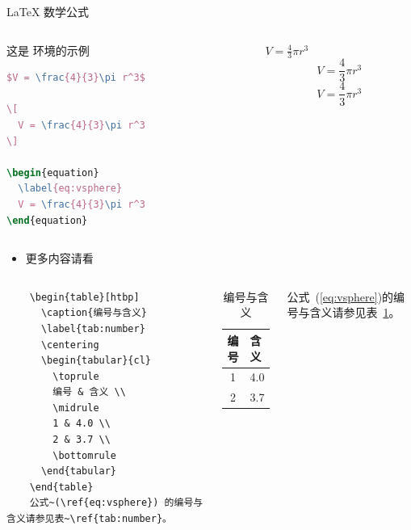 \documentclass{beamer}
\begin{document}
\begin{frame}[fragile]{\LaTeX{} 数学公式}
    \begin{columns}
        \begin{column}{.55\textwidth}
            这是  环境的示例
\begin{lstlisting}[language=TeX]
$V = \frac{4}{3}\pi r^3$

\[
  V = \frac{4}{3}\pi r^3
\]

\begin{equation}
  \label{eq:vsphere}
  V = \frac{4}{3}\pi r^3
\end{equation}
\end{lstlisting}
        \end{column}
        \begin{column}{.4\textwidth}
            $V = \frac{4}{3}\pi r^3$
            \[
                V = \frac{4}{3}\pi r^3
            \]
            \begin{equation}
                \label{eq:vsphere}
                V = \frac{4}{3}\pi r^3
            \end{equation}
        \end{column}
    \end{columns}
    \begin{itemize}
        \item 更多内容请看 \href{https://zh.wikipedia.org/wiki/Help:数学公式}{\color{purple}{这里}}
    \end{itemize}
\end{frame}

\begin{frame}[fragile]
    \begin{columns}
\begin{verbatim}
    \begin{table}[htbp]
      \caption{编号与含义}
      \label{tab:number}
      \centering
      \begin{tabular}{cl}
        \toprule
        编号 & 含义 \\
        \midrule
        1 & 4.0 \\
        2 & 3.7 \\
        \bottomrule
      \end{tabular}
    \end{table}
    公式~(\ref{eq:vsphere}) 的编号与含义请参见表~\ref{tab:number}。
\end{verbatim}
        \begin{table}[htpb]
            \centering
            \caption{编号与含义}
            \label{tab:number}
            \begin{tabular}{cl}\toprule
                编号 & 含义 \\\midrule
                1 & 4.0\\
                2 & 3.7\\\bottomrule
            \end{tabular}
        \end{table}
        \normalsize 公式~(\ref{eq:vsphere})的编号与含义请参见表~\ref{tab:number}。
    \end{columns}
\end{frame}
\end{document}
